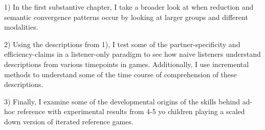 \documentclass[]{article}
\begin{document}
	1) In the first substantive chapter, I take a broader look at when reduction and semantic convergence patterns occur by looking at larger groups and different modalities. 
	
	
	2) Using the descriptions from 1), I test some of the partner-specificity and efficiency-claims in a listener-only paradigm to see how naive listeners understand descriptions from various timepoints in games. Additionally, I use incremental methods to understand some of the time course of comprehension of these descriptions. 
	
	3) Finally, I examine some of the developmental origins of the skills behind ad-hoc reference with experimental results from 4-5 yo children playing a scaled down version of iterated reference games. 

	
%	
%	
%
%
%

\printbibliography
\end{document}
